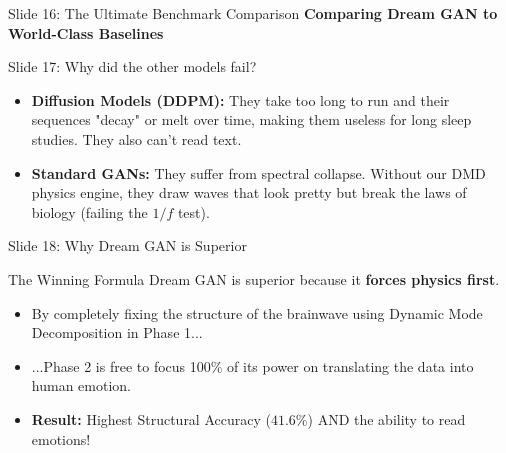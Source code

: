 \documentclass[aspectratio=169]{beamer}
\newcommand{\easysize}{\large}
\begin{document}
\begin{frame}{Slide 16: The Ultimate Benchmark Comparison}
    \centering
    \textbf{Comparing Dream GAN to World-Class Baselines}
    \vspace{0.2cm}
    \begin{table}[h]
        \centering
    \end{table}
\end{frame}

\begin{frame}{Slide 17: Why did the other models fail?}
    \easysize
    \begin{itemize}
        \item \textbf{Diffusion Models (DDPM):} They take too long to run and their sequences "decay" or melt over time, making them useless for long sleep studies. They also can't read text.
        \item \textbf{Standard GANs:} They suffer from spectral collapse. Without our DMD physics engine, they draw waves that look pretty but break the laws of biology (failing the $1/f$ test).
    \end{itemize}
\end{frame}

\begin{frame}{Slide 18: Why Dream GAN is Superior}
    \easysize
    \begin{block}{The Winning Formula}
        Dream GAN is superior because it \textbf{forces physics first}.
    \end{block}
    \vspace{0.3cm}
    \begin{itemize}
        \item By completely fixing the structure of the brainwave using Dynamic Mode Decomposition in Phase 1...
        \item ...Phase 2 is free to focus 100\% of its power on translating the data into human emotion.
        \item \textbf{Result:} Highest Structural Accuracy ($41.6\%$) AND the ability to read emotions!
    \end{itemize}
\end{frame}
\end{document}
